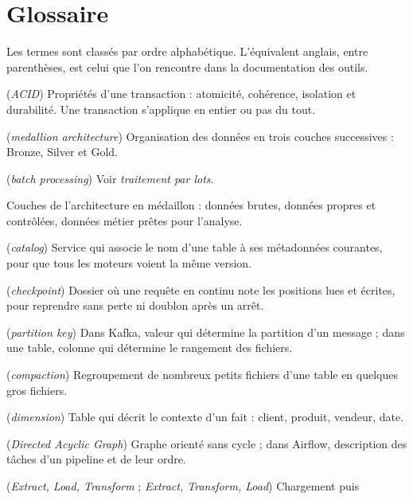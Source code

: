 \chapter{Glossaire}\label{ann:glossaire}

Les termes sont classés par ordre alphabétique. L'équivalent anglais, entre parenthèses, est celui
que l'on rencontre dans la documentation des outils.

\begin{description}[leftmargin=0pt,itemsep=3pt,font=\normalfont\bfseries]
\item[ACID] (\emph{ACID}) Propriétés d'une transaction : atomicité, cohérence, isolation et
  durabilité. Une transaction s'applique en entier ou pas du tout.
\item[Architecture en médaillon] (\emph{medallion architecture}) Organisation des données en trois
  couches successives : Bronze, Silver et Gold.
\item[Batch] (\emph{batch processing}) Voir \emph{traitement par lots}.
\item[Bronze, Silver, Gold] Couches de l'architecture en médaillon : données brutes, données
  propres et contrôlées, données métier prêtes pour l'analyse.
\item[Catalogue] (\emph{catalog}) Service qui associe le nom d'une table à ses métadonnées
  courantes, pour que tous les moteurs voient la même version.
\item[Checkpoint] (\emph{checkpoint}) Dossier où une requête en continu note les positions lues et
  écrites, pour reprendre sans perte ni doublon après un arrêt.
\item[Clé de partition] (\emph{partition key}) Dans Kafka, valeur qui détermine la partition d'un
  message ; dans une table, colonne qui détermine le rangement des fichiers.
\item[Compactage] (\emph{compaction}) Regroupement de nombreux petits fichiers d'une table en
  quelques gros fichiers.
\item[Dimension] (\emph{dimension}) Table qui décrit le contexte d'un fait : client, produit,
  vendeur, date.
\item[DAG] (\emph{Directed Acyclic Graph}) Graphe orienté sans cycle ; dans Airflow, description
  des tâches d'un pipeline et de leur ordre.
\item[ELT, ETL] (\emph{Extract, Load, Transform} ; \emph{Extract, Transform, Load}) Chargement puis

\end{description}
